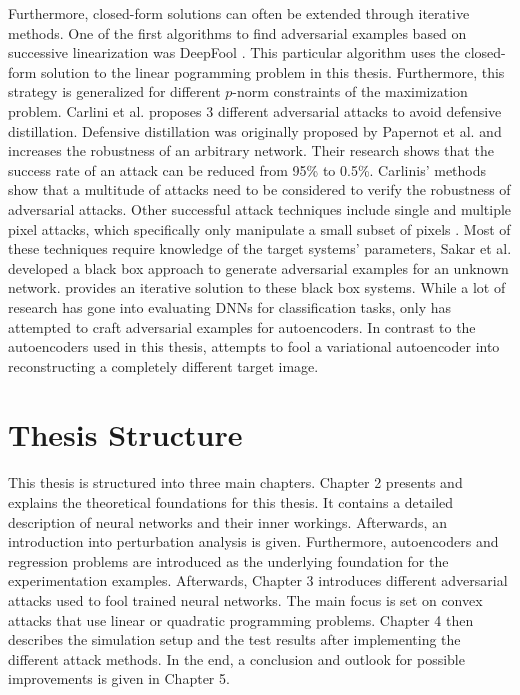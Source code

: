Furthermore, closed-form solutions can often be extended through iterative methods. One of the first algorithms to find adversarial
examples based on successive linearization was DeepFool \cite{DeepFool}. This particular algorithm uses the
closed-form solution to the linear pogramming problem in this thesis. Furthermore, this strategy is generalized for different
$p$-norm constraints of the maximization problem.
Carlini et al. \cite{Robust} proposes 3 different adversarial attacks to avoid defensive distillation. Defensive
distillation was originally proposed by Papernot et al. \cite{Distillation} and increases the robustness of an arbitrary network.
Their research shows that the success rate of an attack can be reduced from 95\% to 0.5\%. Carlinis' methods show that a
multitude of attacks need to be considered to verify the robustness of adversarial attacks.
Other successful attack techniques include single and multiple pixel attacks, which specifically only manipulate a small
subset of pixels \cite{SingleClassification,MultiplePixel}. Most of these techniques require knowledge of the target
systems' parameters, Sakar et al. \cite{BlackBox} developed a black box approach to generate adversarial examples for an unknown
network. \cite{BlackBox2} provides an iterative solution to these black box systems.
While a lot of research has gone into evaluating DNNs for classification tasks, only \cite{VariationalAttack} has attempted to
craft adversarial examples for autoencoders. In contrast to the autoencoders used in this thesis, \cite{VariationalAttack}
attempts to fool a variational autoencoder into reconstructing a completely different target image.
\endgroup


\section{Thesis Structure}\label{sec:section}

\begingroup
This thesis is structured into three main chapters. Chapter 2 presents and explains the theoretical foundations for this
thesis. It contains a detailed description of neural networks and their inner workings. Afterwards, an introduction into
perturbation analysis is given. Furthermore, autoencoders and regression problems are introduced as the underlying
foundation for the experimentation examples.
Afterwards, Chapter 3 introduces different adversarial attacks used to fool trained neural networks. The main focus is set
on convex attacks that use linear or quadratic programming problems. Chapter 4 then describes the simulation setup and the
test results after implementing the different attack methods. In the end, a conclusion and outlook for possible
improvements is given in Chapter 5.
\endgroup
